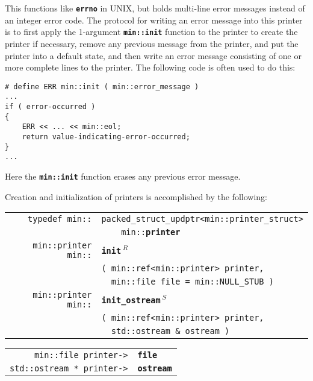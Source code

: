 \documentclass[12pt]{article}
\makeatletter
\newcommand{\TT}[1]{{\tt \bfseries #1}}
\newcommand{\ttmkey}[2]{\TT{#1}\index{#1@{\tt #1}!#2}}
\newcommand{\ttindex}[1]{\index{#1@{\tt #1}}}
\newenvironment{indpar}[1][0.3in]%
	{\begin{list}{}%
		     {\setlength{\itemsep}{0in}%
		      \setlength{\topsep}{0in}%
		      \setlength{\parsep}{1ex}%
		      \setlength{\labelwidth}{#1}%
		      \setlength{\leftmargin}{#1}%
		      \addtolength{\leftmargin}{\labelsep}}%
	 \item}%
	{\end{list}}
\newcommand{\LABEL}[1]{\label{#1}}
\newlength{\ARGBREAKLENGTH}
\newcommand{\ARGBREAK}[1][\ARGBREAKLENGTH]{\\&\hspace*{#1}}
\newcommand{\TTMKEY}[1]{\ttmkey{#1}}
\newcommand{\MINKEY}[1]%
	   {\TT{#1}\ttindex{min::#1}\ttindex{#1}}
\newcommand{\REL}{$\,^R$}
\newcommand{\RESIZE}{$\,^S$}
\makeatother
\begin{document}
This functions like \TT{errno} in UNIX, but
holds multi-line error messages instead of an integer error
code.  The protocol for writing
an error message into this printer is to first apply
the 1-argument \TT{min::init} function to the printer to create the printer
if necessary, remove any previous message from the printer,
and put the printer into a default state,
and then write an error message consisting of one or more
complete lines to the printer.  The following code is often
used to do this:\label{ERROR_MESSAGE_EXAMPLE}
\begin{indpar}\begin{verbatim}
# define ERR min::init ( min::error_message )
...
if ( error-occurred )
{
    ERR << ... << min::eol;
    return value-indicating-error-occurred;
}
...
\end{verbatim}\end{indpar}

Here the \TT{min::init} function erases any previous error
message.

Creation and initialization of printers is
accomplished by the following:

\begin{indpar}[1em]\begin{tabular}{r@{}l}
\verb|typedef min::|
	& \verb|packed_struct_updptr<min::printer_struct>|\ARGBREAK
	  \verb|    min::|\MINKEY{printer}
\LABEL{MIN::PRINTER} \\
\verb|min::printer min::| & \MINKEY{init\REL}\ARGBREAK
    \verb|( min::ref<min::printer> printer,|\ARGBREAK
    \verb|  min::file file = min::NULL_STUB )|
\LABEL{MIN::INIT_OF_PRINTER} \\
\verb|min::printer min::| & \MINKEY{init\_ostream\RESIZE}\ARGBREAK
    \verb|( min::ref<min::printer> printer,|\ARGBREAK
    \verb|  std::ostream & ostream )|
\LABEL{MIN::INIT_OSTREAM_OF_PRINTER} \\
\end{tabular}\end{indpar}

\begin{indpar}[1em]\begin{tabular}{r@{}l}
\verb|min::file printer->| & \TTMKEY{file}{in {\tt min::printer}}
\LABEL{MIN::PRINTER_FILE} \\
\verb|std::ostream * printer->| & \TTMKEY{ostream}{in {\tt min::printer}}
\LABEL{MIN::PRINTER_OSTREAM} \\
\end{tabular}\end{indpar}
\end{document}
